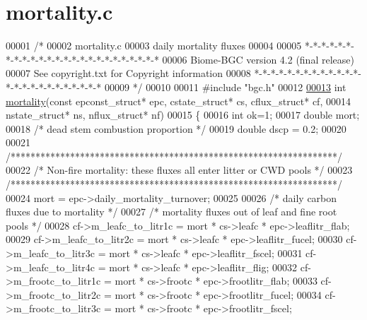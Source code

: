 \hypertarget{mortality_8c_source}{}\section{mortality.\+c}
\label{mortality_8c_source}

\begin{DoxyCode}
00001 \textcolor{comment}{/* }
00002 \textcolor{comment}{mortality.c}
00003 \textcolor{comment}{daily mortality fluxes}
00004 \textcolor{comment}{}
00005 \textcolor{comment}{*-*-*-*-*-*-*-*-*-*-*-*-*-*-*-*-*-*-*-*-*-*-*-*-*}
00006 \textcolor{comment}{Biome-BGC version 4.2 (final release)}
00007 \textcolor{comment}{See copyright.txt for Copyright information}
00008 \textcolor{comment}{*-*-*-*-*-*-*-*-*-*-*-*-*-*-*-*-*-*-*-*-*-*-*-*-*}
00009 \textcolor{comment}{*/}
00010 
00011 \textcolor{preprocessor}{#include "bgc.h"}
00012 
\hypertarget{mortality_8c_source_l00013}{}\hyperlink{mortality_8c_ada5c305af17e64ee9f82e82235340734}{00013} \textcolor{keywordtype}{int} \hyperlink{mortality_8c_ada5c305af17e64ee9f82e82235340734}{mortality}(\textcolor{keyword}{const} epconst\_struct* epc, cstate\_struct* cs, cflux\_struct* cf,
00014 nstate\_struct* ns, nflux\_struct* nf)
00015 \{
00016     \textcolor{keywordtype}{int} ok=1;
00017     \textcolor{keywordtype}{double} mort;
00018     \textcolor{comment}{/* dead stem combustion proportion */}
00019     \textcolor{keywordtype}{double} dscp = 0.2;
00020 
00021     \textcolor{comment}{/******************************************************************/}
00022     \textcolor{comment}{/* Non-fire mortality: these fluxes all enter litter or CWD pools */}
00023     \textcolor{comment}{/******************************************************************/}
00024     mort = epc->daily\_mortality\_turnover;
00025     
00026     \textcolor{comment}{/* daily carbon fluxes due to mortality */}
00027     \textcolor{comment}{/* mortality fluxes out of leaf and fine root pools */}
00028     cf->m\_leafc\_to\_litr1c = mort * cs->leafc * epc->leaflitr\_flab;       
00029     cf->m\_leafc\_to\_litr2c = mort * cs->leafc * epc->leaflitr\_fucel;
00030     cf->m\_leafc\_to\_litr3c = mort * cs->leafc * epc->leaflitr\_fscel;      
00031     cf->m\_leafc\_to\_litr4c = mort * cs->leafc * epc->leaflitr\_flig;       
00032     cf->m\_frootc\_to\_litr1c = mort * cs->frootc * epc->frootlitr\_flab;    
00033     cf->m\_frootc\_to\_litr2c = mort * cs->frootc * epc->frootlitr\_fucel;
00034     cf->m\_frootc\_to\_litr3c = mort * cs->frootc * epc->frootlitr\_fscel;   

\end{DoxyCode}
